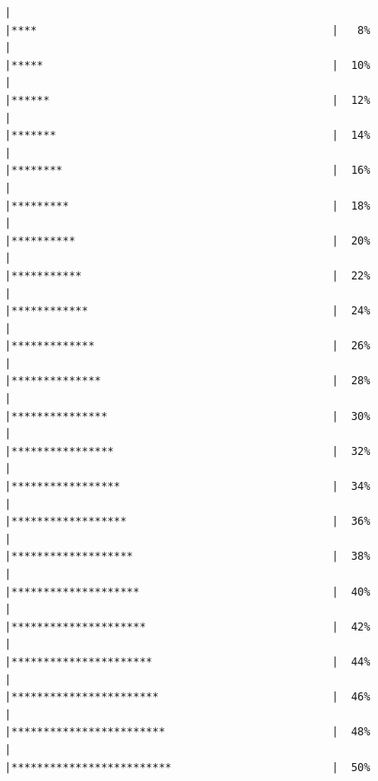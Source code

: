 \documentclass{article}\usepackage[]{graphicx}\usepackage[]{color}
\makeatletter
\newenvironment{kframe}{%
 \def\at@end@of@kframe{}%
 \ifinner\ifhmode%
  \def\at@end@of@kframe{\end{minipage}}%
  \begin{minipage}{\columnwidth}%
 \fi\fi%
 \def\FrameCommand##1{\hskip\@totalleftmargin \hskip-\fboxsep
 \colorbox{shadecolor}{##1}\hskip-\fboxsep
     \hskip-\linewidth \hskip-\@totalleftmargin \hskip\columnwidth}%
 \MakeFramed {\advance\hsize-\width
   \@totalleftmargin\z@ \linewidth\hsize
   \@setminipage}}%
 {\par\unskip\endMakeFramed%
 \at@end@of@kframe}
\newenvironment{knitrout}{}{} %
\makeatother
\begin{document}
\begin{knitrout}
\begin{kframe}
\begin{verbatim}
  |                                                        
  |****                                              |   8%
  |                                                        
  |*****                                             |  10%
  |                                                        
  |******                                            |  12%
  |                                                        
  |*******                                           |  14%
  |                                                        
  |********                                          |  16%
  |                                                        
  |*********                                         |  18%
  |                                                        
  |**********                                        |  20%
  |                                                        
  |***********                                       |  22%
  |                                                        
  |************                                      |  24%
  |                                                        
  |*************                                     |  26%
  |                                                        
  |**************                                    |  28%
  |                                                        
  |***************                                   |  30%
  |                                                        
  |****************                                  |  32%
  |                                                        
  |*****************                                 |  34%
  |                                                        
  |******************                                |  36%
  |                                                        
  |*******************                               |  38%
  |                                                        
  |********************                              |  40%
  |                                                        
  |*********************                             |  42%
  |                                                        
  |**********************                            |  44%
  |                                                        
  |***********************                           |  46%
  |                                                        
  |************************                          |  48%
  |                                                        
  |*************************                         |  50%

\end{verbatim}
\end{kframe}
\end{knitrout}
\end{document}
